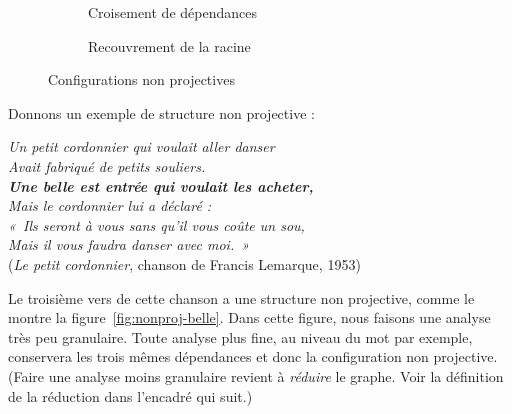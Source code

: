 \begin{figure}
\begin{subfigure}[b]{.5\linewidth}\centering
{}\caption{Croisement de dépendances}\end{subfigure}%
\begin{subfigure}[b]{.5\linewidth}\centering
{}\caption{Recouvrement de la racine}
\end{subfigure}
\caption{\label{fig:nonproj-config}Configurations non projectives}
\end{figure}

Donnons un exemple de structure non projective :

\ea\label{ex:belle-complet}
\textit{Un petit cordonnier qui voulait aller danser}\\
\textit{Avait fabriqué de petits souliers.}\\
\textit{\textbf{Une belle est entrée qui voulait les acheter,}}\\
\textit{Mais le cordonnier lui a déclaré :}\\
\textit{«~Ils seront à vous sans qu’il vous coûte un sou,}\\
\textit{Mais il vous faudra danser avec moi.~»}\\
\textrm{(\textit{Le petit cordonnier}, chanson de Francis Lemarque, 1953)}
\z

Le troisième vers de cette chanson a une structure non projective, comme le montre la figure~\ref{fig:nonproj-belle}. Dans cette figure, nous faisons une analyse très peu granulaire. Toute analyse plus fine, au niveau du mot par exemple, conservera les trois mêmes dépendances et donc la configuration non projective. (Faire une analyse moins granulaire revient à \textit{réduire} le graphe. Voir la définition de la réduction dans l’encadré qui suit.) 

